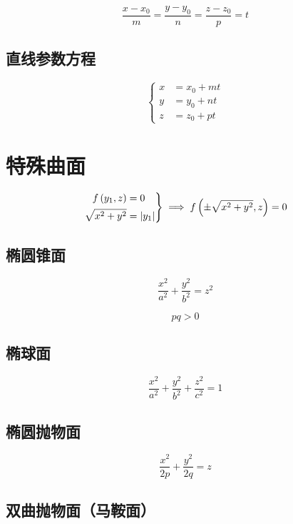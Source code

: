 \documentclass{article}
\begin{document}
\[\frac{x-x_0}m=\frac{y-y_0}n=\frac{z-z_0}p=t\]

\subsection{直线参数方程}

\[\left\{\begin{aligned}
        x & =x_0+mt \\
        y & =y_0+nt \\
        z & =z_0+pt
    \end{aligned}\right.\]

\section{特殊曲面}

\begin{definition}[绕$z$轴旋转曲面：（原曲线为$f\p{y_1,z}=0$）]
    \[\left.\begin{aligned}
            f\left(y_1,z\right)     & =0         \\
            \sqrt{x^2+y^2} & =\left|y_1\right|
        \end{aligned}\right\}
        \implies
        f\left(\pm\sqrt{x^2+y^2},z\right)=0\]
\end{definition}

\subsection{椭圆锥面}

\[\frac{x^2}{a^2}+\frac{y^2}{b^2}=z^2\]

\begin{definition}[以下二次曲面方程中都有]
    \[pq>0\]
\end{definition}

\subsection{椭球面}

\[\frac{x^2}{a^2}+\frac{y^2}{b^2}+\frac{z^2}{c^2}=1\]

\subsection{椭圆抛物面}

\[\frac{x^2}{2p}+\frac{y^2}{2q}=z\]

\subsection{双曲抛物面（马鞍面）}
\end{document}
